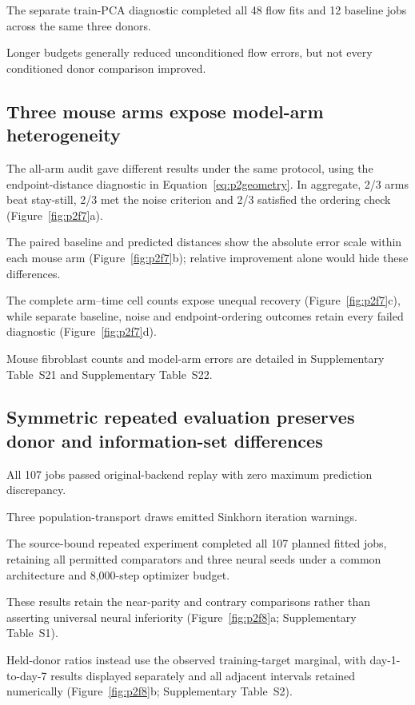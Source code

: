 \documentclass[10pt,a4paper]{article}
\begin{document}
The separate train-PCA diagnostic completed all 48 flow fits and 12 baseline jobs across the same three donors.

Longer budgets generally reduced unconditioned flow errors, but not every conditioned donor comparison improved.

\subsection{Three mouse arms expose model-arm heterogeneity}

The all-arm audit gave different results under the same protocol, using the endpoint-distance diagnostic in Equation~\eqref{eq:p2geometry}. In aggregate, 2/3 arms beat stay-still, 2/3 met the noise criterion and 2/3 satisfied the ordering check (Figure~\ref{fig:p2f7}a\label{call:p2f7}).

The paired baseline and predicted distances show the absolute error scale within each mouse arm (Figure~\ref{fig:p2f7}b); relative improvement alone would hide these differences.

The complete arm--time cell counts expose unequal recovery (Figure~\ref{fig:p2f7}c), while separate baseline, noise and endpoint-ordering outcomes retain every failed diagnostic (Figure~\ref{fig:p2f7}d).



Mouse fibroblast counts and model-arm errors are detailed in Supplementary Table~S21 and Supplementary Table~S22.

\subsection{Symmetric repeated evaluation preserves donor and information-set differences}

All 107 jobs passed original-backend replay with zero maximum prediction discrepancy.

Three population-transport draws emitted Sinkhorn iteration warnings.

The source-bound repeated experiment completed all 107 planned fitted jobs, retaining all permitted comparators and three neural seeds under a common architecture and 8,000-step optimizer budget.

These results retain the near-parity and contrary comparisons rather than asserting universal neural inferiority (Figure~\ref{fig:p2f8}a\label{call:p2f8}; Supplementary Table~S1).

Held-donor ratios instead use the observed training-target marginal, with day-1-to-day-7 results displayed separately and all adjacent intervals retained numerically (Figure~\ref{fig:p2f8}b; Supplementary Table~S2).
\end{document}
